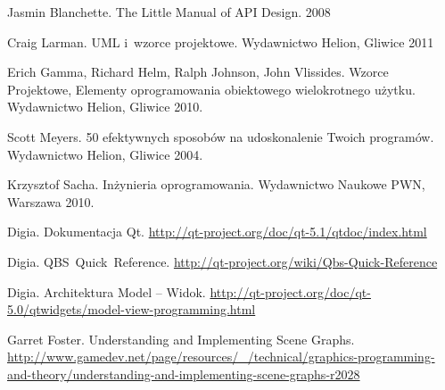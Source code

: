 \renewcommand{\bibname}{\section{Sources}}
\begin{thebibliography}{}
Jasmin Blanchette. The Little Manual of API Design. 2008

Craig Larman. UML i~wzorce projektowe. Wydawnictwo Helion, Gliwice 2011

Erich Gamma, Richard Helm, Ralph Johnson, John Vlissides. Wzorce Projektowe, Elementy oprogramowania obiektowego wielokrotnego użytku. Wydawnictwo Helion, Gliwice 2010.

Scott Meyers. 50 efektywnych sposobów na udoskonalenie Twoich programów. Wydawnictwo Helion, Gliwice 2004.

Krzysztof Sacha. Inżynieria oprogramowania. Wydawnictwo Naukowe PWN, Warszawa 2010.

Digia. Dokumentacja Qt. \url{http://qt-project.org/doc/qt-5.1/qtdoc/index.html}

Digia. QBS~Quick~Reference. \url{http://qt-project.org/wiki/Qbs-Quick-Reference}

Digia. Architektura Model -- Widok. \url{http://qt-project.org/doc/qt-5.0/qtwidgets/model-view-programming.html}

Garret Foster. Understanding and Implementing Scene Graphs. \url{http://www.gamedev.net/page/resources/\_/technical/graphics-programming-and-theory/understanding-and-implementing-scene-graphs-r2028}

\end{thebibliography}
